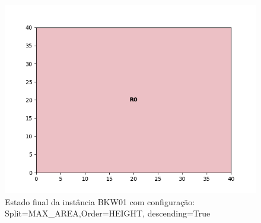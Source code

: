 \begin{figure}[H]
    \centering
    \caption[]{Estado final da instância BKW01 com configuração: Split=MAX_AREA,Order=HEIGHT, descending=True}
    \label{fig:bkw01-max_area-height-true}
    \includegraphics[scale=0.5]{output/figures/bkw/bkw01/max_area/height/true/00}
\end{figure}